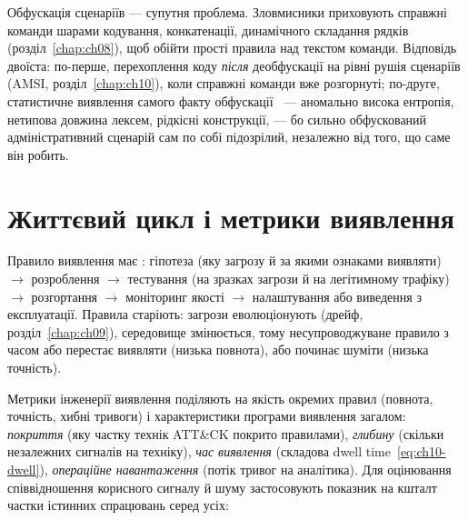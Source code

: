 Обфускація сценаріїв --- супутня проблема. Зловмисники приховують справжні команди шарами кодування, конкатенації, динамічного складання рядків (розділ~\ref{chap:ch08}), щоб обійти прості правила над текстом команди. Відповідь двоїста: по-перше, перехоплення коду \emph{після} деобфускації на рівні рушія сценаріїв (AMSI, розділ~\ref{chap:ch10}), коли справжні команди вже розгорнуті; по-друге, статистичне виявлення самого факту обфускації~\cite{ch11:powershell} --- аномально висока ентропія, нетипова довжина лексем, рідкісні конструкції, --- бо сильно обфускований адміністративний сценарій сам по собі підозрілий, незалежно від того, що саме він робить.

\section{Життєвий цикл і метрики виявлення}\label{sec:ch11-lifecycle}

Правило виявлення має : гіпотеза (яку загрозу й за якими ознаками виявляти) $\to$ розроблення $\to$ тестування (на зразках загрози й на легітимному трафіку) $\to$ розгортання $\to$ моніторинг якості $\to$ налаштування або виведення з експлуатації. Правила старіють: загрози еволюціонують (дрейф, розділ~\ref{chap:ch09}), середовище змінюється, тому несупроводжуване правило з часом або перестає виявляти (низька повнота), або починає шуміти (низька точність).

\begin{tikzfig}
\end{tikzfig}

Метрики інженерії виявлення поділяють на якість окремих правил (повнота, точність, хибні тривоги) і характеристики програми виявлення загалом: \emph{покриття} (яку частку технік ATT\&CK покрито правилами), \emph{глибину} (скільки незалежних сигналів на техніку), \emph{час виявлення} (складова dwell time~\eqref{eq:ch10-dwell}), \emph{операційне навантаження} (потік тривог на аналітика). Для оцінювання співвідношення корисного сигналу й шуму застосовують показник на кшталт частки істинних спрацювань серед усіх:

